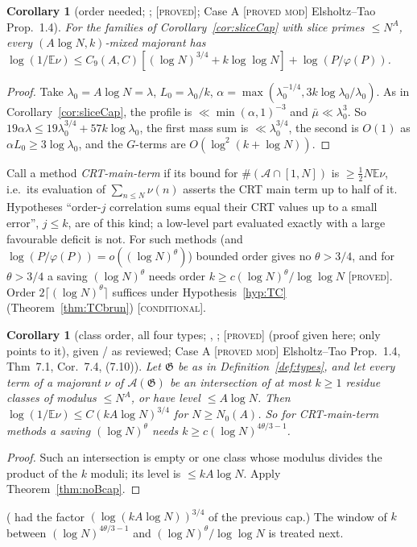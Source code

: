\documentclass[10pt,reqno]{amsart}
\newtheorem{corollary}[theorem]{Corollary}
\theoremstyle{definition}
\theoremstyle{remark}
\newcommand{\A}{\mathcal A}
\newcommand{\cG}{\mathfrak G}
\newcommand{\E}{\mathbb E}
\newcommand{\lab}[1]{\textup{[\textsc{#1}]}}
\begin{document}
\begin{corollary}[order needed; {\cite[Cors~3.2, 3.3]{TU}}; \lab{proved}; Case A \lab{proved mod} Elsholtz--Tao Prop.~1.4]\label{cor:orderslice}
For the families of Corollary~\ref{cor:sliceCap} with slice primes $\leq N^A$,
every $(A\log N,k)$-mixed majorant has
$\log(1/\E\nu)\leq C_9(A,C)[(\log N)^{3/4}+k\log\log N]+\log(P/\varphi(P))$.
\end{corollary}
\begin{proof}
Take $\lambda_0=A\log N=\lambda$, $L_0=\lambda_0/k$, $\alpha=\max(\lambda_0^{-1/4},3k\log\lambda_0/\lambda_0)$.  As in
Corollary~\ref{cor:sliceCap}, the profile is $\ll\min(\alpha,1)^{-3}$ and
$\bar\mu\ll\lambda_0^3$.  So $19\alpha\lambda\leq19\lambda_0^{3/4}+57k\log\lambda_0$, the first mass sum is
$\ll\lambda_0^{3/4}$, the second is $O(1)$ as $\alpha L_0\geq3\log\lambda_0$, and the
$G$-terms are $O(\log^2(k+\log N))$.
\end{proof}
Call a method \emph{CRT-main-term} if its bound for $\#(\A\cap[1,N])$ is
$\geq\frac12N\E\nu$, i.e.\ its evaluation of $\sum_{n\leq N}\nu(n)$ asserts the CRT
main term up to half of it.  Hypotheses ``order-$j$ correlation sums equal
their CRT values up to a small error'', $j\leq k$, are of this kind; a
low-level part evaluated exactly with a large favourable deficit is not.
For such methods (and $\log(P/\varphi(P))=o((\log N)^\theta)$) bounded order gives no
$\theta>3/4$, and for $\theta>3/4$ a saving $(\log N)^\theta$ needs order $k\geq c(\log N)^\theta/\log\log N$
\lab{proved}.  Order $2\lceil(\log N)^\theta\rceil$ suffices under
Hypothesis~\ref{hyp:TC} (Theorem~\ref{thm:TCbrun}) \lab{conditional}.

\begin{corollary}[class order, all four types; {\cite[Cor.~3.4]{TU}}, {\cite[\S4.3]{KA3}}; \lab{proved} (proof given here; {\cite[\S4.3]{KA3}} only points to it), given {\cite{KA}}/{\cite{KA2}} as reviewed; Case A \lab{proved mod} Elsholtz--Tao Prop.~1.4, Thm~7.1, Cor.~7.4, (7.10)]\label{cor:classorder}
Let $\cG$ be as in Definition~\ref{def:types}, and let every term of a
majorant $\nu$ of $\A(\cG)$ be an intersection of at most $k\geq1$ residue classes
of modulus $\leq N^A$, or have level $\leq A\log N$.  Then
$\log(1/\E\nu)\leq C(kA\log N)^{3/4}$ for $N\geq N_0(A)$.  So for CRT-main-term
methods a saving $(\log N)^\theta$ needs $k\geq c(\log N)^{4\theta/3-1}$.
\end{corollary}
\begin{proof}
Such an intersection is empty or one class whose modulus divides the
product of the $k$ moduli; its level is $\leq kA\log N$.  Apply
Theorem~\ref{thm:noBcap}.
\end{proof}
(\cite{TU} had the factor $(\log(kA\log N))^{3/4}$ of the previous cap.)  The
window of $k$ between $(\log N)^{4\theta/3-1}$ and $(\log N)^\theta/\log\log N$ is
treated next.
\end{document}
